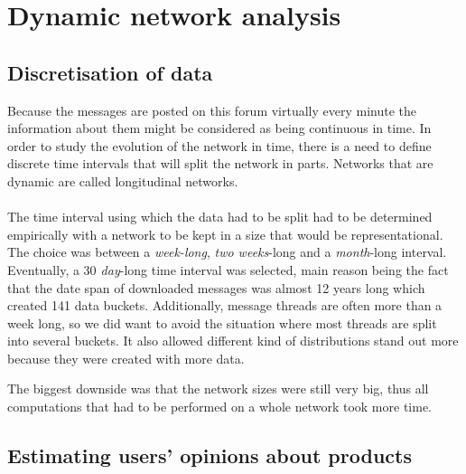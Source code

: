 \newpage
\section{Dynamic network analysis}

  \subsection{Discretisation of data}
  
    Because the messages are posted on this forum virtually every minute the information about them might be considered as being continuous in time. In order to study the evolution of the network in time, there is a need to define discrete time intervals that will split the network in parts. Networks that are dynamic are called longitudinal networks.
    \\\\
    The time interval using which the data had to be split had to be determined empirically with a network to be kept in a size that would be representational. The choice was between a \emph{week-long}, \emph{two weeks}-long and a \emph{month}-long interval. Eventually, a \emph{$30$ day}-long time interval was selected, main reason being the fact that the date span of downloaded messages was almost 12 years long which created 141 data buckets. Additionally, message threads are often more than a week long, so we did want to avoid the situation where most threads are split into several buckets. It also allowed different kind of distributions stand out more because they were created with more data.
    
    The biggest downside was that the network sizes were still very big, thus all computations that had to be performed on a whole network took more time.
    
  \subsection{Estimating users' opinions about products} \label{sec:opinion_estimation}
  
